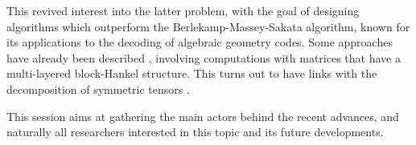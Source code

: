 \documentclass[12pt,english]{article}
\begin{document}
This revived interest into the latter problem, with the goal of designing
algorithms which outperform the Berlekamp-Massey-Sakata algorithm, known for
its applications to the decoding of algebraic geometry codes.  Some approaches
have already been described \cite{BerBoyFau17,Mourrain17}, involving
computations with matrices that have a multi-layered block-Hankel structure.
This turns out to have links with the decomposition of symmetric tensors
\cite{BrCoMots10}.

This session aims at gathering the main actors behind the recent advances, and
naturally all researchers interested in this topic and its future developments.




\end{document}
